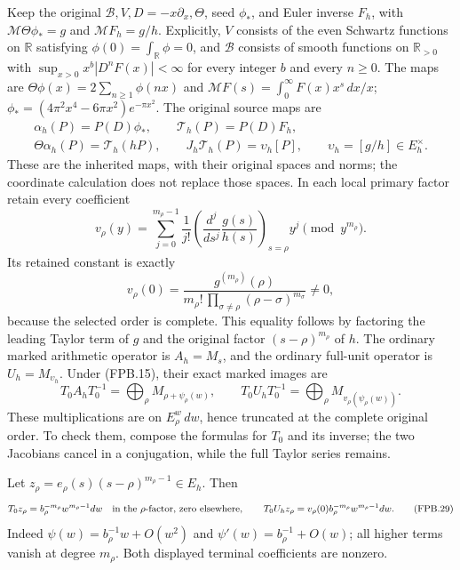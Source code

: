 Keep the original \(\mathscr B,V,D=-x\partial_x,\Theta\), seed
\(\phi_*\), and Euler inverse \(F_h\), with
\(\mathcal M\Theta\phi_*=g\) and \(\mathcal M F_h=g/h\).
Explicitly, \(V\) consists of the even Schwartz functions on
\(\mathbb R\) satisfying \(\phi(0)=\int_{\mathbb R}\phi=0\),
and \(\mathscr B\) consists of smooth functions on
\(\mathbb R_{>0}\) with
\(\sup_{x>0}x^b|D^nF(x)|<\infty\) for every integer \(b\)
and every \(n\ge0\). The maps are
\(\Theta\phi(x)=2\sum_{n\ge1}\phi(nx)\) and
\(\mathcal MF(s)=\int_0^\infty F(x)x^s\,dx/x\);
\(\phi_*=(4\pi^2x^4-6\pi x^2)e^{-\pi x^2}\).
The original source maps are
\[
 \begin{gathered}
 \alpha_h(P)=P(D)\phi_*,\qquad
 \mathcal T_h(P)=P(D)F_h,\\
 \Theta\alpha_h(P)=\mathcal T_h(hP),\qquad
 J_h\mathcal T_h(P)=\upsilon_h[P],
 \qquad \upsilon_h=[g/h]\in E_h^\times.
 \end{gathered}
 \tag{FPB.26}\label{eq:fpb-theta}
\]
These are the inherited maps, with their original spaces and norms;
the coordinate calculation does not replace those spaces. In each
local primary factor retain every coefficient
\[
 v_\rho(y)=\sum_{j=0}^{m_\rho-1}
    \frac1{j!}\left(\frac{d^j}{ds^j}\frac{g(s)}{h(s)}
             \right)_{s=\rho}y^j\pmod {y^{m_\rho}}.
 \tag{FPB.27}\label{eq:fpb-unit}
\]
Its retained constant is exactly
\[
 v_\rho(0)=\frac{g^{(m_\rho)}(\rho)}
  {m_\rho!\,\prod_{\sigma\ne\rho}(\rho-\sigma)^{m_\sigma}}
  \ne0,
\]
because the selected order is complete. This equality follows by
factoring the leading Taylor term of \(g\) and the original factor
\((s-\rho)^{m_\rho}\) of \(h\).
The ordinary marked arithmetic operator is \(A_h=M_s\), and
the ordinary full-unit operator is \(U_h=M_{\upsilon_h}\).
Under (FPB.15), their exact marked images are
\[
 T_0A_hT_0^{-1}=\bigoplus_\rho M_{\rho+\psi_\rho(w)},\qquad
 T_0U_hT_0^{-1}=\bigoplus_\rho M_{v_\rho(\psi_\rho(w))}.
 \tag{FPB.28}\label{eq:fpb-marked-arithmetic}
\]
These multiplications are on \(E_\rho^w\,dw\), hence truncated
at the complete original order. To check them, compose the formulas
for \(T_0\) and its inverse; the two Jacobians cancel in a
conjugation, while the full Taylor series remains.

Let \(z_\rho=e_\rho(s)(s-\rho)^{m_\rho-1}\in E_h\). Then
\[
 T_0z_\rho=b_\rho^{-m_\rho}w^{m_\rho-1}dw
       \quad\hbox{in the \(\rho\)-factor, zero elsewhere},
 \qquad
 T_0U_hz_\rho=v_\rho(0)b_\rho^{-m_\rho}
                       w^{m_\rho-1}dw.
 \tag{FPB.29}\label{eq:fpb-terminal}
\]
Indeed \(\psi(w)=b_\rho^{-1}w+O(w^2)\) and
\(\psi'(w)=b_\rho^{-1}+O(w)\); all higher terms vanish at
degree \(m_\rho\). Both displayed terminal coefficients are nonzero.

